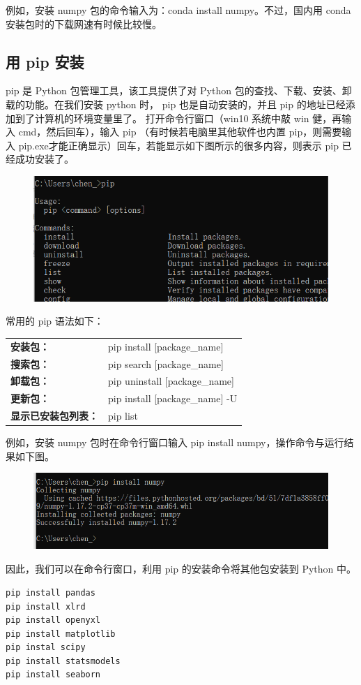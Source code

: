 例如，安装 numpy 包的命令输入为：conda install numpy。不过，国内用 conda 安装包时的下载网速有时候比较慢。

\subsection{用 pip 安装}
pip 是 Python 包管理工具，该工具提供了对 Python 包的查找、下载、安装、卸载的功能。在我们安装 python 时， pip 也是自动安装的，并且 pip 的地址已经添加到了计算机的环境变量里了。 打开命令行窗口（win10 系统中敲 win 健，再输入 cmd，然后回车），输入 pip （有时候若电脑里其他软件也内置 pip，则需要输入 pip.exe才能正确显示）回车，若能显示如下图所示的很多内容，则表示 pip 已经成功安装了。

\begin{figure}[!ht]
  \centering
  \includegraphics[scale=0.6]{figure/chapter1/pip.png}
\end{figure}

常用的 pip 语法如下：

\begin{center}
\begin{tcolorbox}[title = pip 的常用语法]
  \centering\bf
  \begin{tcboutputlisting}
  \begin{tabular}{>{\bfseries}ll}
    安装包：&pip install [package\_name]\\
    搜索包：&pip search [package\_name]\\
    卸载包：&pip uninstall [package\_name]\\
    更新包： & pip install [package\_name] -U\\
  显示已安装包列表： &pip list
  \end{tabular}
\end{tcboutputlisting}
\end{tcolorbox}
\end{center}

例如，安装 numpy 包时在命令行窗口输入 pip install numpy，操作命令与运行结果如下图。
\begin{figure}[!ht]
  \centering
  \includegraphics[scale=0.6]{figure/chapter1/pip2.png}
\end{figure}



因此，我们可以在命令行窗口，利用 pip 的安装命令将其他包安装到 Python 中。

\begin{lstlisting}
pip install pandas
pip install xlrd
pip install openyxl
pip install matplotlib
pip instal scipy
pip install statsmodels
pip install seaborn
\end{lstlisting}
